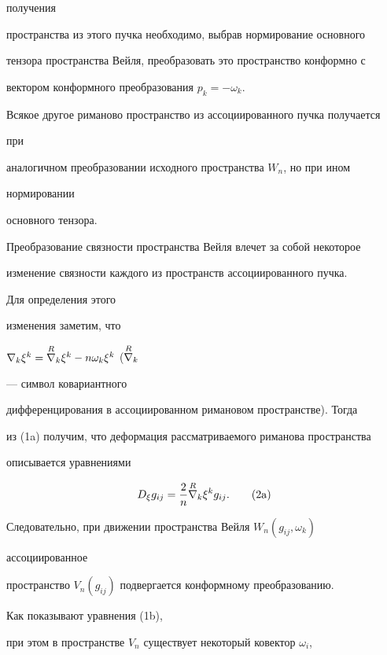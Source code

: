 получения 


пространства из этого пучка необходимо, выбрав нормирование основного 


тензора пространства Вейля, преобразовать это пространство конформно с 


вектором конформного преобразования $p_k=-\omega_k$. 


Всякое другое риманово пространство из ассоциированного пучка получается 


при 


аналогичном преобразовании исходного пространства $W_n$, но при ином 


нормировании 


основного тензора. 


 


Преобразование связности пространства Вейля влечет за собой некоторое 


изменение связности каждого из пространств ассоциированного пучка. 


Для определения этого 


изменения заметим, что 


$\nabla_k\xi^k=\overset{R}{\nabla}{}_k\xi^k-n\omega_k\xi^k$ ($\overset{R}{\nabla}{}_k$ 


--- символ ковариантного 


дифференцирования в ассоциированном римановом пространстве). Тогда 


из (1a) получим, что деформация рассматриваемого риманова пространства 


описывается уравнениями 


\begin{equation} 


D_\xi g_{ij}=\frac{2}{n}\up{R}{\nabla}_k\xi^k g_{ij}.\tag{2a} 


\end{equation} 


\addtocounter{equation}{2}


 


Следовательно, при движении пространства Вейля $W_n(g_{ij},\omega_k)$ 


ассоциированное 


пространство $V_n(g_{ij})$ подвергается конформному преобразованию. 


Как показывают уравнения (1b), 


при этом в пространстве $V_n$ существует некоторый ковектор $\omega_i$, 


